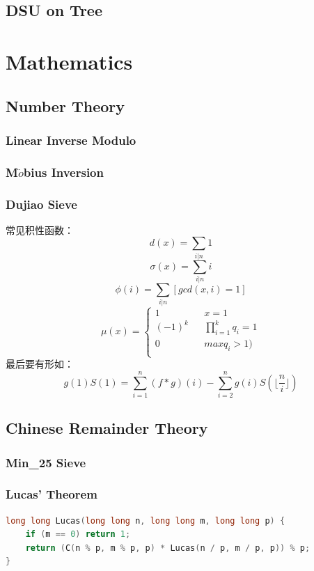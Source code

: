 \documentclass[10pt,UTF8,a4paper,twoside]{ctexart}
\begin{document}
\begin{multicols}{2}
	\subsection{DSU on Tree}
\clearpage

\section{Mathematics}
	\subsection{Number Theory}
		\subsubsection{Linear Inverse Modulo}
			
		\subsubsection{M$\ddot{o}$bius Inversion}
		\subsubsection{Dujiao Sieve}
			常见积性函数：
				$$d(x)=\sum_{i|n}{1}$$
				$$\sigma(x)=\sum_{i|n}{i}$$
				$$\phi(i)=\sum_{i|n}{[gcd(x,i)=1]}$$
				\begin{equation}
					\nonumber
					\mu(x)=\left\{
					\begin{array}{rcl}
						1 & & {x=1}\\
						(-1)^k & & {\prod_{i=1}^{k}{q_i}=1}\\
						0 & & {max{q_i} > 1)}\\
					\end{array} \right.
				\end{equation}
			最后要有形如：
			$$g(1)S(1)=\sum_{i=1}^{n}{(f*g)(i)} - \sum_{i=2}^{n}{g(i)S(\lfloor \frac{n}{i} \rfloor)} $$
			
		\subsection{Chinese Remainder Theory}
			
		
		\subsubsection{Min\_25 Sieve}
		\subsubsection{Lucas' Theorem}
			\begin{lstlisting}[language=C++]
long long Lucas(long long n, long long m, long long p) {
	if (m == 0) return 1;
	return (C(n % p, m % p, p) * Lucas(n / p, m / p, p)) % p;
}
			\end{lstlisting}

\end{multicols}
\end{document}
